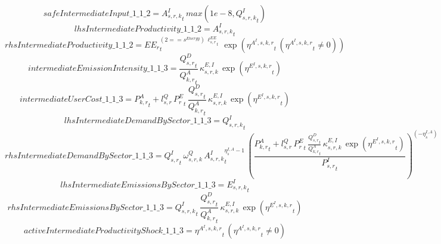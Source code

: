 \begin{dmath*}
safeIntermediateInput\_1\_1\_2 = {{A^{I}_{s,r,k}}}_{t}\, max(1e-8,{{Q^{I}_{s,r,k}}}_{t})
\end{dmath*}
\begin{dmath*}
lhsIntermediateProductivity\_1\_1\_2 = {{A^{I}_{s,r,k}}}_{t}
\end{dmath*}
\begin{dmath*}
rhsIntermediateProductivity\_1\_1\_2 = {{EE_r}}_{t}^{\left(2=={{s^{Energy}}}\right)\, {{\ell^{EE}_{s,r}}}_{t}}\, \exp\left({{\eta^{A^{I},s,k,r}}}_{t}\, \left({{\eta^{A^{I},s,k,r}}}_{t}\neq 0\right)\right)
\end{dmath*}
\begin{dmath*}
intermediateEmissionIntensity\_1\_1\_3 = \frac{{{Q^{D}_{s,r}}}_{t}}{{{Q^{A}_{k,r}}}_{t}}\, {{\kappa^{E,I}_{s,r,k}}}\, \exp\left({{\eta^{E^{I},s,k,r}}}_{t}\right)
\end{dmath*}
\begin{dmath*}
intermediateUserCost\_1\_1\_3 = {{P^{A}_{k,r}}}_{t}+{{l^{Q}_{s,r}}}\, {{P^E_r}}_{t}\, \frac{{{Q^{D}_{s,r}}}_{t}}{{{Q^{A}_{k,r}}}_{t}}\, {{\kappa^{E,I}_{s,r,k}}}\, \exp\left({{\eta^{E^{I},s,k,r}}}_{t}\right)
\end{dmath*}
\begin{dmath*}
lhsIntermediateDemandBySector\_1\_1\_3 = {{Q^{I}_{s,r,k}}}_{t}
\end{dmath*}
\begin{dmath*}
rhsIntermediateDemandBySector\_1\_1\_3 = {{Q^{I}_{s,r}}}_{t}\, {{\omega^{Q}_{s,r,k}}}\, {{A^{I}_{s,r,k}}}_{t}^{{{\eta^{I,A}_{s}}}-1}\, \left(\frac{{{P^{A}_{k,r}}}_{t}+{{l^{Q}_{s,r}}}\, {{P^E_r}}_{t}\, \frac{{{Q^{D}_{s,r}}}_{t}}{{{Q^{A}_{k,r}}}_{t}}\, {{\kappa^{E,I}_{s,r,k}}}\, \exp\left({{\eta^{E^{I},s,k,r}}}_{t}\right)}{{{P^{I}_{s,r}}}_{t}}\right)^{\left(-{{\eta^{I,A}_{s}}}\right)}
\end{dmath*}
\begin{dmath*}
lhsIntermediateEmissionsBySector\_1\_1\_3 = {{E^I_{s,r,k}}}_{t}
\end{dmath*}
\begin{dmath*}
rhsIntermediateEmissionsBySector\_1\_1\_3 = {{Q^{I}_{s,r,k}}}_{t}\, \frac{{{Q^{D}_{s,r}}}_{t}}{{{Q^{A}_{k,r}}}_{t}}\, {{\kappa^{E,I}_{s,r,k}}}\, \exp\left({{\eta^{E^{I},s,k,r}}}_{t}\right)
\end{dmath*}
\begin{dmath*}
activeIntermediateProductivityShock\_1\_1\_3 = {{\eta^{A^{I},s,k,r}}}_{t}\, \left({{\eta^{A^{I},s,k,r}}}_{t}\neq 0\right)
\end{dmath*}
